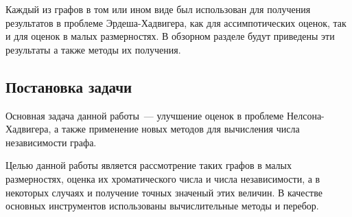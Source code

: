 Каждый из графов в том или ином виде был использован для получения результатов
в проблеме Эрдеша-Хадвигера, как для ассимпотических оценок, так и
для оценок в малых размерностях.
В обзорном разделе будут приведены эти результаты а также методы их получения.

\subsection{Постановка задачи}

Основная задача данной работы~--- улучшение оценок в проблеме
Нелсона-Хадвигера, а также применение новых методов для
вычисления числа независимости графа.

Целью данной работы является рассмотрение таких графов в малых размерностях,
оценка их хроматического числа и числа независимости, а в некоторых случаях и
получение точных значеный этих величин. В качестве основных инструментов
использованы вычислительные методы и перебор.
